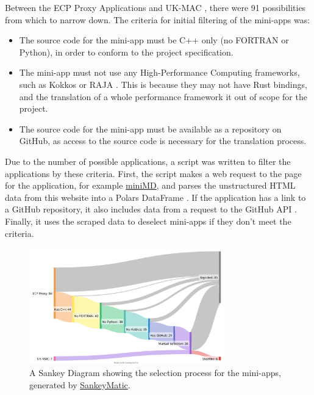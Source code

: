 Between the ECP Proxy Applications \cite{ECPProxyApplications} and UK-MAC \cite{UKMiniAppConsortium}, there were 91 possibilities from which to narrow down. The criteria for initial filtering of the mini-apps was:
\begin{itemize}
    \item The source code for the mini-app must be C++ only (no FORTRAN or Python), in order to conform to the project specification.
    \item The mini-app must not use any High-Performance Computing frameworks, such as Kokkos \cite{KokkosEcosystem} or RAJA \cite{RAJAPortabilitySuite}. This is because they may not have Rust bindings, and the translation of a whole performance framework it out of scope for the project.
    \item The source code for the mini-app must be available as a repository on GitHub, as access to the source code is necessary for the translation process.
\end{itemize}

Due to the number of possible applications, a script was written to filter the applications by these criteria. First, the script makes a web request to the page for the application, for example \href{https://proxyapps.exascaleproject.org/app/minimd/}{miniMD}, and parses the unstructured HTML data from this website into a Polars DataFrame \cite{PolarsPolars2023}. If the application has a link to a GitHub repository, it also includes data from a request to the GitHub API \cite{GitHubRESTAPI}. Finally, it uses the scraped data to deselect mini-apps if they don't meet the criteria.

\begin{figure}[h]
    \centering
    \includegraphics[width=0.75\textwidth]{images/8_appendix/miniapp_sankey.png}
    \caption{A Sankey Diagram showing the selection process for the mini-apps, generated by \href{https://sankeymatic.com/build/}{SankeyMatic}.}
    \label{fig:miniapp_sankey}
\end{figure}

